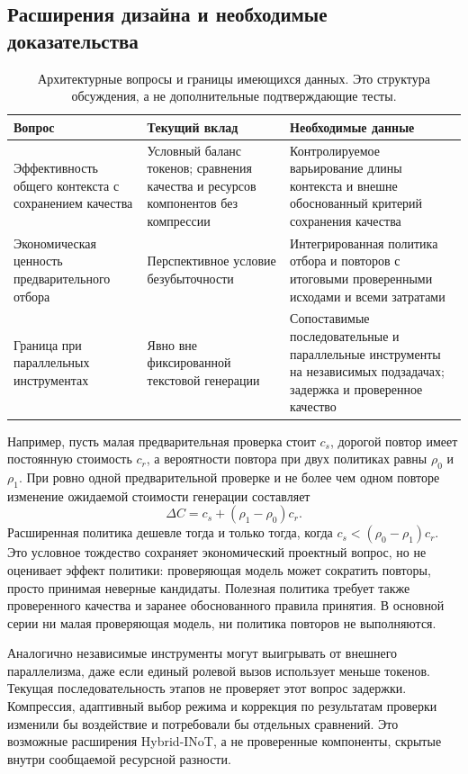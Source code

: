 \subsection{Расширения дизайна и необходимые доказательства}
\begin{table}[htbp]\centering\small
\caption{Архитектурные вопросы и границы имеющихся данных. Это структура обсуждения, а не дополнительные подтверждающие тесты.}
\label{tab:hybrid-scope}
\begin{tabularx}{\textwidth}{@{}>{\raggedright\arraybackslash}p{}>{\raggedright\arraybackslash}X>{\raggedright\arraybackslash}X@{}}\toprule
Вопрос & Текущий вклад & Необходимые данные\\\midrule
Эффективность общего контекста с сохранением качества & Условный баланс токенов; сравнения качества и ресурсов компонентов без компрессии & Контролируемое варьирование длины контекста и внешне обоснованный критерий сохранения качества\\
Экономическая ценность предварительного отбора & Перспективное условие безубыточности & Интегрированная политика отбора и повторов с итоговыми проверенными исходами и всеми затратами\\
Граница при параллельных инструментах & Явно вне фиксированной текстовой генерации & Сопоставимые последовательные и параллельные инструменты на независимых подзадачах; задержка и проверенное качество\\\bottomrule
\end{tabularx}\end{table}

Например, пусть малая предварительная проверка стоит $c_s$, дорогой повтор имеет постоянную стоимость $c_r$, а вероятности повтора при двух политиках равны $\rho_0$ и $\rho_1$. При ровно одной предварительной проверке и не более чем одном повторе изменение ожидаемой стоимости генерации составляет
\begin{equation}
\Delta C=c_s+(\rho_1-\rho_0)c_r.
\label{eq:hybrid-screen}
\end{equation}
Расширенная политика дешевле тогда и только тогда, когда $c_s<(\rho_0-\rho_1)c_r$. Это условное тождество сохраняет экономический проектный вопрос, но не оценивает эффект политики: проверяющая модель может сократить повторы, просто принимая неверные кандидаты. Полезная политика требует также проверенного качества и заранее обоснованного правила принятия. В основной серии ни малая проверяющая модель, ни политика повторов не выполняются.

Аналогично независимые инструменты могут выигрывать от внешнего параллелизма, даже если единый ролевой вызов использует меньше токенов. Текущая последовательность этапов не проверяет этот вопрос задержки. Компрессия, адаптивный выбор режима и коррекция по результатам проверки изменили бы воздействие и потребовали бы отдельных сравнений. Это возможные расширения Hybrid-INoT, а не проверенные компоненты, скрытые внутри сообщаемой ресурсной разности.
